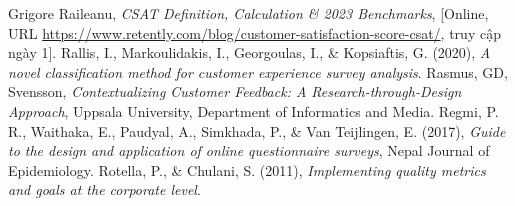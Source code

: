 \begin{thebibliography}{9}
     Grigore Raileanu, \textit{CSAT\: Definition, Calculation \& 2023 Benchmarks}, [Online, URL\: \url{https://www.retently.com/blog/customer-satisfaction-score-csat/}, truy cập ngày 1].
     Rallis, I., Markoulidakis, I., Georgoulas, I., \& Kopsiaftis, G. (2020), \textit{A novel classification method for customer experience survey analysis}.
     Rasmus, GD, Svensson, \textit{Contextualizing Customer Feedback: A Research-through-Design Approach}, Uppsala University, Department of Informatics and Media.
     Regmi, P. R., Waithaka, E., Paudyal, A., Simkhada, P., \& Van Teijlingen, E. (2017), \textit{Guide to the design and application of online questionnaire surveys}, Nepal Journal of Epidemiology.
     Rotella, P., \& Chulani, S. (2011), \textit{Implementing quality metrics and goals at the corporate level}.
\end{thebibliography}